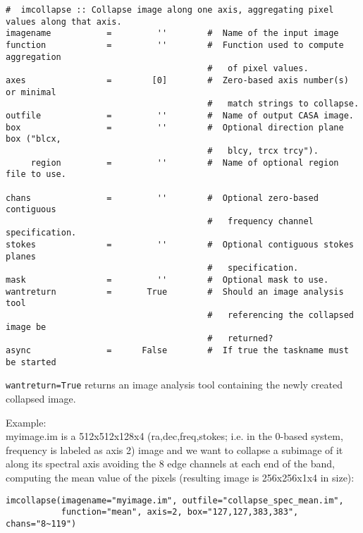 \small
\begin{verbatim}
#  imcollapse :: Collapse image along one axis, aggregating pixel values along that axis.
imagename           =         ''        #  Name of the input image
function            =         ''        #  Function used to compute aggregation
                                        #   of pixel values.
axes                =        [0]        #  Zero-based axis number(s) or minimal
                                        #   match strings to collapse.
outfile             =         ''        #  Name of output CASA image.
box                 =         ''        #  Optional direction plane box ("blcx,
                                        #   blcy, trcx trcy").
     region         =         ''        #  Name of optional region file to use.

chans               =         ''        #  Optional zero-based contiguous
                                        #   frequency channel specification.
stokes              =         ''        #  Optional contiguous stokes planes
                                        #   specification.
mask                =         ''        #  Optional mask to use.
wantreturn          =       True        #  Should an image analysis tool
                                        #   referencing the collapsed image be
                                        #   returned?
async               =      False        #  If true the taskname must be started
\end{verbatim}
\normalsize

{\tt wantreturn=True} returns an image analysis tool containing the
newly created collapsed image.

Example:\\

myimage.im is a 512x512x128x4 (ra,dec,freq,stokes; i.e. in the 0-based
system, frequency is labeled as axis 2) image and we want to
collapse a subimage of it along its spectral axis avoiding the 8 edge
 channels at each end of the band, computing the mean value of the
pixels (resulting image is 256x256x1x4 in size):

\small
\begin{verbatim}
imcollapse(imagename="myimage.im", outfile="collapse_spec_mean.im",
           function="mean", axis=2, box="127,127,383,383", chans="8~119")
\end{verbatim}
\normalsize


